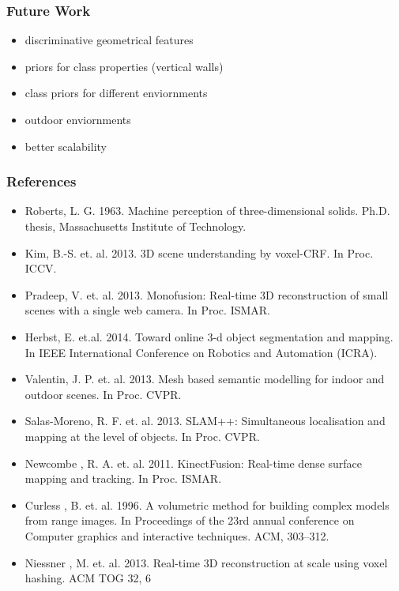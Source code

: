 \documentclass[mathserif, 10pt]{beamer}
\begin{document}
\begin{frame}
\frametitle{Future Work}
\begin{itemize}
  \item discriminative geometrical features
  \item priors for class properties (vertical walls)
 \item class priors for different enviornments
 \item outdoor enviornments
 \item better scalability
\end{itemize}


\end{frame}


\begin{frame}
\frametitle{References}
\fontsize{6pt}{7.2}\selectfont
\begin{itemize}
  \item Roberts, L. G. 1963. Machine perception of three-dimensional solids. Ph.D. thesis, Massachusetts Institute of Technology.

  \item Kim, B.-S. et. al. 2013. 3D scene understanding by voxel-CRF. In Proc. ICCV.

  \item Pradeep, V. et. al. 2013. Monofusion: Real-time 3D reconstruction of small scenes with a single web camera. In Proc. ISMAR.

  \item Herbst, E. et.al. 2014. Toward online 3-d object segmentation and mapping. In IEEE International Conference on Robotics and Automation (ICRA).

  \item Valentin, J. P. et. al. 2013. Mesh based semantic modelling for indoor and outdoor scenes. In Proc. CVPR.

  \item Salas-Moreno, R. F. et. al. 2013. SLAM++: Simultaneous localisation and mapping at the level of objects. In Proc. CVPR.

  \item Newcombe , R. A. et. al. 2011. KinectFusion: Real-time dense surface mapping and tracking. In Proc. ISMAR.  
  
  \item Curless , B. et. al. 1996. A volumetric method for building complex models from range images. In Proceedings of the 23rd annual conference on Computer graphics and interactive techniques. ACM, 303–312.
  
  \item Niessner , M. et. al. 2013. Real-time 3D reconstruction at scale using voxel hashing. ACM TOG 32, 6
\end{itemize}
\end{frame}
\end{document}
